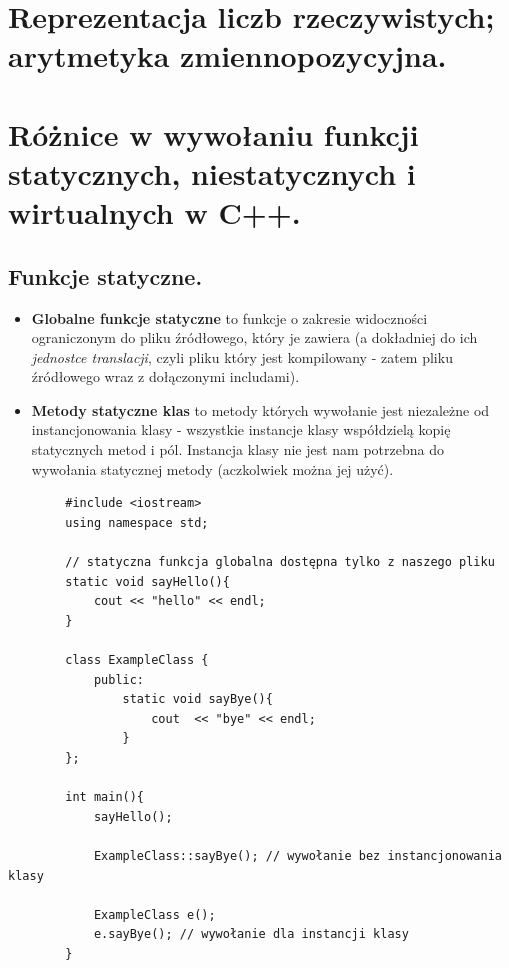\documentclass[12pt]{article}
\begin{document}
    \section{Reprezentacja liczb rzeczywistych; arytmetyka zmiennopozycyjna.}

    \newpage

    \section{Różnice w wywołaniu funkcji statycznych, niestatycznych i wirtualnych w C++.}

    \subsection{Funkcje statyczne.}
    \begin{itemize}
        \item \textbf{Globalne funkcje statyczne} to funkcje o zakresie widoczności ograniczonym do pliku źródłowego, który je
        zawiera (a dokładniej do ich \textit{jednostce translacji}, czyli pliku który jest kompilowany - zatem pliku
        źródłowego wraz z dołączonymi includami).
        \item \textbf{Metody statyczne klas} to metody których wywołanie jest niezależne od instancjonowania klasy -
        wszystkie instancje klasy współdzielą kopię statycznych metod i pól. Instancja klasy nie jest nam potrzebna
        do wywołania statycznej metody (aczkolwiek można jej użyć).
    \end{itemize}

    \begin{verbatim}
        #include <iostream>
        using namespace std;

        // statyczna funkcja globalna dostępna tylko z naszego pliku
        static void sayHello(){
            cout << "hello" << endl;
        }

        class ExampleClass {
            public:
                static void sayBye(){
                    cout  << "bye" << endl;
                }
        };

        int main(){
            sayHello();

            ExampleClass::sayBye(); // wywołanie bez instancjonowania klasy

            ExampleClass e();
            e.sayBye(); // wywołanie dla instancji klasy
        }
    \end{verbatim}
\end{document}
